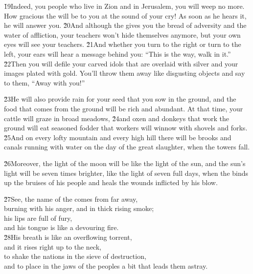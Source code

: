 \v{19}Indeed, you people who live in Zion and in Jerusalem, you will weep no more. How gracious the  will be to you at the sound of your cry! As soon as he hears it, he will answer you. \v{20}And although the  gives you the bread of adversity and the water of affliction, your teachers won't hide themselves anymore, but your own eyes will see your teachers. \v{21}And whether you turn to the right or turn to the left, your ears will hear a message behind you: ``This is the way, walk in it.'' \v{22}Then you will defile your carved idols that are overlaid with silver and your images plated with gold. You'll throw them away like disgusting objects and say to them, ``Away with you!''

\v{23}He will also provide rain for your seed that you sow in the ground, and the food that comes from the ground will be rich and abundant. At that time, your cattle will graze in broad meadows, \v{24}and oxen and donkeys that work the ground will eat seasoned fodder that workers will winnow with shovels and forks. \v{25}And on every lofty mountain and every high hill there will be brooks and canals running with water on the day of the great slaughter, when the towers fall.

\v{26}Moreover, the light of the moon will be like the light of the sun, and the sun's light will be seven times brighter, like the light of seven full days, when the  binds up the bruises of his people and heals the wounds inflicted by his blow.

\begin{poetry}
\poeml \v{27}See, the name of the  comes from far away, \\
\poemll    burning with his anger, and in thick rising smoke; \\
\poeml his lips are full of fury, \\
\poemll    and his tongue is like a devouring fire. \\
\poeml \v{28}His breath is like an overflowing torrent, \\
\poemll    and it rises right up to the neck, \\
\poeml to shake the nations in the sieve of destruction, \\
\poemll    and to place in the jaws of the peoples a bit that leads them astray.
\end{poetry}

